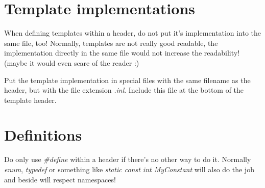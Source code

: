 \section{Template implementations}
When defining templates within a header, do not put it's implementation into the same file, too! Normally, templates are not really good readable, the implementation directly in the same file would not increase the readability! (maybe it would even scare of the reader :)

Put the template implementation in special files with the same filename as the header, but with the file extension \emph{.inl}. Include this file at the bottom of the template header.




\section{Definitions}
Do only use \emph{\#define} within a header if there's no other way to do it. Normally \emph{enum}, \emph{typedef} or something like \emph{static const int MyConstant} will also do the job and beside will respect namespaces!
